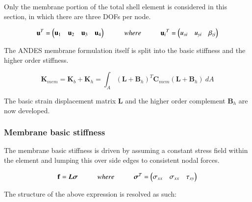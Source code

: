 Only the membrane portion of the total shell element is considered in this section, in which there are three DOFs per node.

\begin{equation} 
\mathbf{u}^T = 
\begin{pmatrix}
\mathbf{u}_1 & \mathbf{u}_2 & \mathbf{u}_3 & \mathbf{u}_4
\end{pmatrix} 
\hspace{10mm}
where
\hspace{10mm}
\mathbf{u}{_i}^T = 
\begin{pmatrix}
{u_{xi}} & {u_{yi}} & {\beta_{zi}}
\end{pmatrix}
\label{equation04}
\end{equation}

The ANDES membrane formulation itself is split into the basic stiffness and the higher order stiffness.

\begin{equation} 
\mathbf{K}_{mem} = \mathbf{K}_{b} + \mathbf{K}_{h} = \int_A (\mathbf{L} + \mathbf{B}_h)^T \mathbf{C}_{mem} (\mathbf{L} + \mathbf{B}_h)\ dA
\label{equationMEM}
\end{equation}

The basic strain displacement matrix $\textbf{L}$ and the higher order complement $\textbf{B}_h$ are now developed. 

\subsubsection{Membrane basic stiffness}

The membrane basic stiffness is driven by assuming a constant stress field within the element and lumping this over side edges to consistent nodal forces. 

\begin{equation} 
\mathbf{f} = \boldsymbol{L\sigma}
\hspace{10mm}
where
\hspace{10mm}
\boldsymbol{\sigma}^T =
\begin{pmatrix}
\sigma_{xx} & \sigma_{xx} & \tau_{xy}
\end{pmatrix}
\label{equation05}
\end{equation}

The structure of the above expression is resolved as such: 

